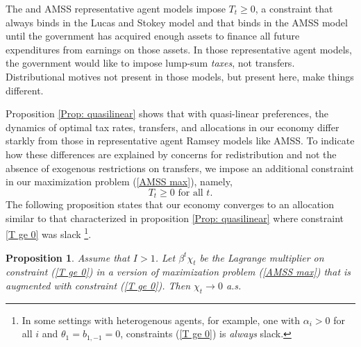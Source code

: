 \documentclass[thmsb,11pt]{article}
\newtheorem{proposition}{Proposition}
\begin{document}
The \cite{LucasJr.1983} and AMSS representative agent models
impose $T_{t}\geq 0$, a constraint that always binds in the Lucas and Stokey
model and that binds in the AMSS model  until the government has acquired enough
assets to finance all future expenditures from earnings on those assets. In those
representative agent models, the government would like to impose lump-sum \emph{taxes}, not
transfers. Distributional motives not present in those models, but present here, make things  different.
\smallskip

\smallskip Proposition \ref{Prop: quasilinear} shows that with quasi-linear preferences,  the dynamics of optimal
 tax rates, transfers,  and allocations in our economy differ starkly
 from those in representative agent Ramsey models like AMSS. To indicate how these differences are explained by concerns for redistribution and not the absence of exogenous restrictions on transfers, we impose an additional constraint in our maximization problem (\ref{AMSS max}), namely,
\begin{equation}
T_{t}\geq 0\text{ for all }t.  \label{T ge 0}
\end{equation}%
The following proposition states that our economy converges to an allocation similar to that characterized  in proposition \ref{Prop: quasilinear} where constraint \eqref{T ge 0} was slack \footnote{In  some settings with heterogenous
agents, for example, one with $\alpha_i >0$ for all $i$ and $\theta_1 = b_{1,-1} =0$, constraints (\ref{T ge 0}) is \emph{always} slack.}.
\smallskip

\begin{proposition}\label{prop:AMSS_killer1}
Assume that $I > 1$.
Let $\beta ^{t}\chi _{t}$ be the Lagrange multiplier on constraint (\ref{T
ge 0}) in a version of  maximization problem (\ref{AMSS max}) that is augmented with constraint (\ref{T
ge 0}). Then $\chi _{t}\rightarrow
0 $ a.s.
\end{proposition}
\end{document}
